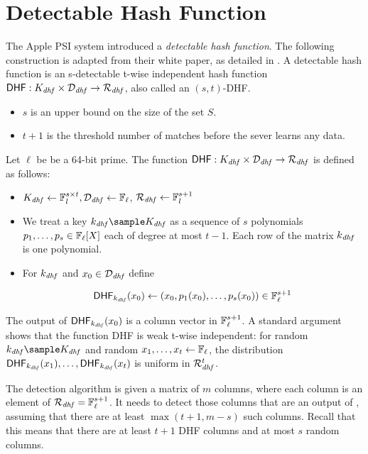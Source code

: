 \section{Detectable Hash Function}
\label{sec:dhf}
The Apple PSI system introduced a \emph{detectable hash function}. The following construction is adapted from their white paper, as detailed in \cite{pinkas2021applepsi}. A detectable hash function is an s-detectable t-wise independent hash function $\dhf: \dhfKeySpace \times \dhfDomain \rightarrow \dhfRange$, also called an $(s,t)$-DHF.

\begin{itemize}
    \item $s$ is an upper bound on the size of the set $S$.
    \item $t+1$ is the threshold number of matches before the sever learns any data.
\end{itemize}


Let $\ell$ be be a 64-bit prime. The function $\dhf: \dhfKeySpace \times \dhfDomain \rightarrow \dhfRange$ is defined as follows:

\begin{itemize}
    \item $ K_{\mathit{dhf}} \gets \mathbb{F}^{s \times t}_l, \mathcal{D}_{\mathit{dhf}} \gets \mathbb{F}_{\ell}$, $\mathcal{R}_{\mathit{dhf}} \gets \mathbb{F}^{s+1}_l$
    \item We treat a key $\dhfKey \sample \dhfKeySpace$ as a sequence of $s$ polynomials $p_1, \dots, p_s \in \mathbb{F}_{\ell}[X]$ each of degree at most $t-1$. Each row of the matrix $k_{\mathit{dhf}}$ is one polynomial.
    \item For $k_{\mathit{dhf}}$ and $x_0 \in \mathcal{D}_{\mathit{dhf}}$ define 
    
    \[\dhf[\dhfKey](x_0) \assign (x_0,p_1(x_0),\dots,p_s(x_0)) \in \field^{s+1}_{\ell}
    \]
\end{itemize}

The output of $\dhf[\dhfKey](x_0)$ is a column vector in $\mathbb{F}^{s+1}_\ell$. A standard argument shows that the function DHF is weak t-wise independent: for random $\dhfKey \sample \dhfKeySpace$ and random $x_1, \dots, x_t \gets \mathbb{F}_\ell$, the distribution $\dhf[\dhfKey](x_1), \dots , \dhf[\dhfKey](x_t)$ is uniform in $\mathcal{R}_{\mathit{dhf}}^t$.

%
The detection algorithm is given a matrix of $m$ columns, where each column is an element of $\mathcal{R}_{\mathit{dhf}} = \mathbb{F}^{s+1}_{\ell}$. It needs to detect those columns that are an output of \dhf, assuming that there are at least $\max(t+1,m - s)$ such columns. Recall that this means that there are at least $t + 1$ DHF columns and at most $s$ random columns.

